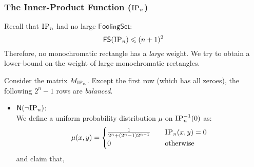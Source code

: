 \documentclass[usletter]{article}
\newcommand {\complexity}[1] {\ensuremath{\mathsf{#1}}}
\newcommand {\N}             {\complexity{N}}
\newcommand {\FS}            {\complexity{FS}}
\newcommand {\function}[2]  {\ensuremath{\textsc{#1}_{#2}}}
\newcommand {\efunction}[3] {\ensuremath{\textsc{#1}^{#2}_{#3}}}
\begin{document}
\subsubsection*{The Inner-Product Function (\function{IP}{n})}

Recall that \function{IP}{n} had no large \complexity{FoolingSet}:
$$
  \FS(\function{IP}{n}) \leqslant (n+1)^2
$$
Therefore, no monochromatic rectangle has a \textit{large} weight. We try to obtain a lower-bound on the weight of large monochromatic rectangles.

Consider the matrix $\displaystyle M_{\function{IP}{n}}$. Except the first row (which has all zeroes), the following $2^n-1$ rows are \textit{balanced}.

\begin{itemize}
  \item $\N(\neg\function{IP}{n})$: \\
    We define a uniform probability distribution $\mu$ on $\efunction{IP}{-1}{n}(0)$ as:
    {\large$$
    \mu(x,y) =
      \begin{cases}
        \frac{1}{2^n + (2^n - 1)2^{n-1} } &\quad \function{IP}{n}(x,y) = 0 \\
        0 &\quad \text{otherwise} \\
      \end{cases}
    $$}
    and claim that,


\end{itemize}
\end{document}
